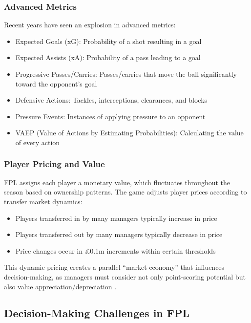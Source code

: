 \subsubsection{Advanced Metrics}

Recent years have seen an explosion in advanced metrics:
\begin{itemize}
    \item Expected Goals (xG): Probability of a shot resulting in a goal
    \item Expected Assists (xA): Probability of a pass leading to a goal
    \item Progressive Passes/Carries: Passes/carries that move the ball significantly toward the opponent's goal
    \item Defensive Actions: Tackles, interceptions, clearances, and blocks
    \item Pressure Events: Instances of applying pressure to an opponent
    \item VAEP (Value of Actions by Estimating Probabilities): Calculating the value of every action \cite{decroos2019, fernandez2021}
\end{itemize}

\subsubsection{Player Pricing and Value}

FPL assigns each player a monetary value, which fluctuates throughout the season based on ownership patterns. The game adjusts player prices according to transfer market dynamics:
\begin{itemize}
    \item Players transferred in by many managers typically increase in price
    \item Players transferred out by many managers typically decrease in price
    \item Price changes occur in £0.1m increments within certain thresholds \cite{tran2022}
\end{itemize}

This dynamic pricing creates a parallel ``market economy'' that influences decision-making, as managers must consider not only point-scoring potential but also value appreciation/depreciation \cite{constantinou2017}.

\subsection{Decision-Making Challenges in FPL}

